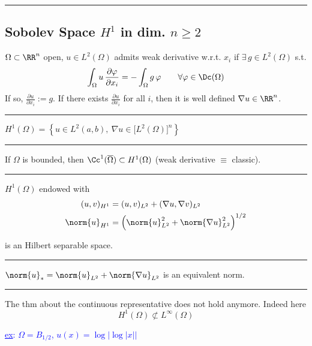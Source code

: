 \rule{0.31\textwidth}{0.2pt}


\subsection{\color{red}Sobolev Space \texorpdfstring{$H^1$}{C} in dim. \texorpdfstring{$n\geq 2$}{C}}


$\Omega\subset \RR^n$ open, $u\in L^2(\Omega)$ admits weak derivative w.r.t. $x_i$ if $\exists\,g\in L^2(\Omega)$ s.t.
\begin{equation*}
\int_\Omega u\,\frac{\partial\varphi}{\partial x_i}=-\int_\Omega g\,\varphi\qquad\forall \varphi\in \Dc(\Omega)
\end{equation*}
If so, $\frac{\partial u}{\partial x_i} :=g$. If there exists $\frac{\partial u}{\partial x_i}$ for all $i$, then it is well defined $\nabla u\in\RR^n$. 

\rule{0.31\textwidth}{0.2pt}
\smallskip

$H^1(\Omega) = \left\{ u\in L^2(a,b),\ \nabla u\in\big[ L^2(\Omega) \big]^n \right\}$

\rule{0.31\textwidth}{0.2pt}
\smallskip

If $\Omega$ is bounded, then $\Cc^1(\overline{\Omega})\subset H^1(\Omega)$ (weak derivative $\equiv$ classic).

\rule{0.31\textwidth}{0.2pt}
\smallskip

$H^1(\Omega)$ endowed with
\begin{align*}
(u,v)_{H^1}&=(u,v)_{L^2}+(\nabla u,\nabla v)_{L^2} \\
\norm{u}_{H^1}&=\left( \norm{u}^2_{L^2}+\norm{\nabla u}^2_{L^2} \right)^{1/2}
\end{align*}

is an Hilbert separable space.

\rule{0.31\textwidth}{0.2pt}
\smallskip

$\norm{u}_{*}=\norm{u}_{L^2}+\norm{\nabla u}
_{L^2}$ is an equivalent norm.

\rule{0.31\textwidth}{0.2pt}
\smallskip

The thm about the continuous representative does not hold anymore. Indeed here
\begin{equation*}
H^1(\Omega)\not\subset L^\infty(\Omega)
\end{equation*}

\textcolor{blue}{\underline{ex}: $\Omega=B_{1/2}$, $u(x)=\log\left| \log \left| x \right| \right|$ }

